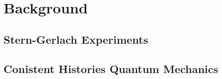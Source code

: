 \part{Background}
\chapter{Stern-Gerlach Experiments}
\chapter{Conistent Histories Quantum Mechanics}
